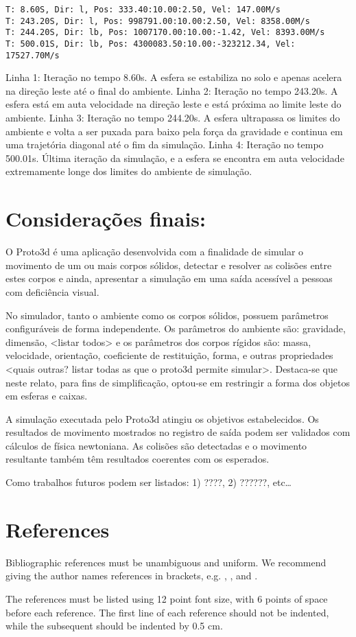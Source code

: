 \documentclass[12pt]{article}
\begin{document}
\begin{lstlisting}[frame=single,caption=Esfera sobre o chão e saída do ambiente\label{lg:esferaM4}]
T: 8.60S, Dir: l, Pos: 333.40:10.00:2.50, Vel: 147.00M/s
T: 243.20S, Dir: l, Pos: 998791.00:10.00:2.50, Vel: 8358.00M/s
T: 244.20S, Dir: lb, Pos: 1007170.00:10.00:-1.42, Vel: 8393.00M/s
T: 500.01S, Dir: lb, Pos: 4300083.50:10.00:-323212.34, Vel: 17527.70M/s
\end{lstlisting}

Linha 1: Iteração no tempo 8.60s. A esfera se estabiliza no solo e apenas acelera na direção leste até o final do ambiente.
Linha 2: Iteração no tempo 243.20s. A esfera está em auta velocidade na direção leste e está próxima ao limite leste do ambiente.
Linha 3: Iteração no tempo 244.20s. A esfera ultrapassa os limites do ambiente e volta a ser puxada para baixo pela força da gravidade e continua em uma trajetória diagonal até o fim da simulação.
Linha 4: Iteração no tempo 500.01s. Última iteração da simulação, e a esfera se encontra em auta velocidade extremamente longe dos limites do ambiente de simulação.

\section{ Considerações finais:}
O Proto3d é uma aplicação desenvolvida com a finalidade de simular o movimento de um ou mais corpos sólidos, detectar e resolver as colisões entre estes corpos e ainda, apresentar a simulação em uma saída acessível a pessoas com deficiência visual.

No simulador, tanto o ambiente como os corpos sólidos, possuem parâmetros configuráveis de forma independente. Os parâmetros do ambiente são:  gravidade, dimensão, <listar todos>  e os parâmetros dos corpos rígidos são: massa, velocidade, orientação, coeficiente de restituição, forma, e outras propriedades <quais outras? listar todas as que o proto3d permite simular>. Destaca-se que neste relato, para fins de simplificação, optou-se em restringir a forma dos objetos em esferas e caixas.

A simulação executada pelo Proto3d atingiu os objetivos estabelecidos. Os resultados de movimento mostrados no registro de saída podem ser validados com cálculos de física newtoniana. As colisões são detectadas e o movimento resultante também têm resultados coerentes com os esperados. 

Como trabalhos futuros podem ser listados: 1) ????, 2) ??????, etc…



\section{References}

Bibliographic references must be unambiguous and uniform.  We recommend giving
the author names references in brackets, e.g. \cite{knuth:84},
\cite{boulic:91}, and \cite{smith:99}.

The references must be listed using 12 point font size, with 6 points of space
before each reference. The first line of each reference should not be
indented, while the subsequent should be indented by 0.5 cm.



\end{document}
